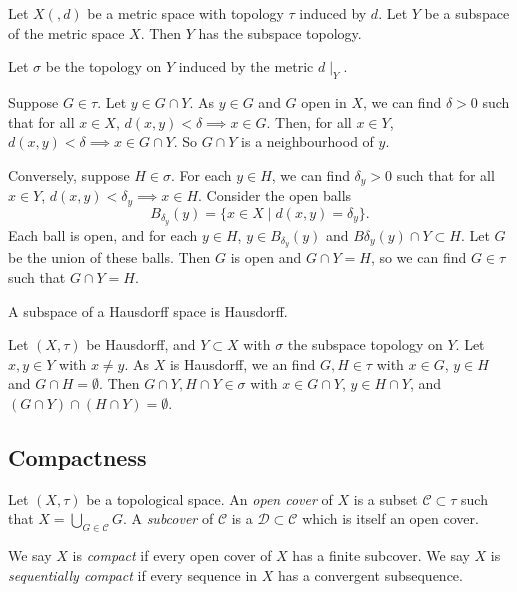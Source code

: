 \documentclass[12pt]{article}
\begin{document}
\begin{proposition}
	Let $X(, d)$ be a metric space with topology $\tau$ induced by $d$. Let $Y$ be a subspace of the metric space $X$. Then $Y$ has the subspace topology.
\end{proposition}

\begin{proofbox}
	Let $\sigma$ be the topology on $Y$ induced by the metric $d\mid_{Y}$.

	Suppose $G \in \tau$. Let $y \in G \cap Y$. As $y \in G$ and $G$ open in $X$, we can find $\delta > 0$ such that for all $x \in X$, $d(x, y) < \delta \implies x \in G$. Then, for all $x \in Y$, $d(x, y) < \delta \implies x \in G \cap Y$. So $G \cap Y$ is a neighbourhood of $y$.

	Conversely, suppose $H \in \sigma$. For each $y \in H$, we can find $\delta_y > 0$ such that for all $x \in Y$, $d(x, y) < \delta_y \implies x \in H$. Consider the open balls
	\[
		B_{\delta_y}(y) = \{x \in X \mid d(x, y) = \delta_y\}
	.\]
	Each ball is open, and for each $y \in H$, $y \in B_{\delta_y}(y)$ and $B \delta_y(y) \cap Y \subset H$. Let $G$ be the union of these balls. Then $G$ is open and $G \cap Y = H$, so we can find $G \in \tau$ such that $G \cap Y = H$.
\end{proofbox}

\begin{proposition}
	A subspace of a Hausdorff space is Hausdorff.
\end{proposition}

\begin{proofbox}
	Let $(X, \tau)$ be Hausdorff, and $Y \subset X$ with $\sigma$ the subspace topology on $Y$. Let $x, y \in Y$ with $x \neq y$. As $X$ is Hausdorff, we an find $G, H \in \tau$ with $x \in G$, $y \in H$ and $G \cap H = \emptyset$. Then $G \cap Y, H \cap Y \in \sigma$ with $x \in G \cap Y$, $y \in H \cap Y$, and $(G \cap Y) \cap (H \cap Y) = \emptyset$.
\end{proofbox}

\subsection{Compactness}%
\label{sub:compactness}

\begin{definition}
	Let $(X, \tau)$ be a topological space. An \textit{open cover} of $X$ is a subset $\mathcal{C} \subset \tau$ such that $X = \bigcup_{G \in \mathcal{C}}G$. A \textit{subcover} of $\mathcal{C}$ is a $\mathcal{D} \subset \mathcal{C}$ which is itself an open cover.

	We say $X$ is \textit{compact} if every open cover of $X$ has a finite subcover. We say $X$ is \textit{sequentially compact} if every sequence in $X$ has a convergent subsequence.
\end{definition}
\end{document}
